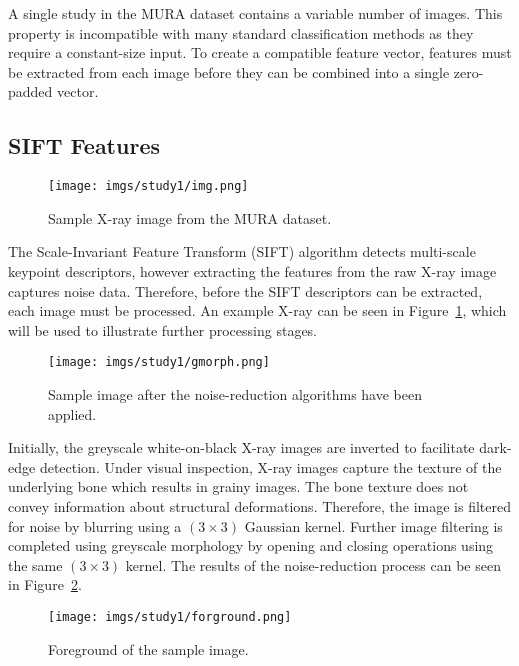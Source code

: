 \documentclass{IEEEtran}
\begin{document}
	A single study in the MURA dataset contains a variable number of images. This property is incompatible with many standard classification methods as they require a constant-size input. To create a compatible feature vector, features must be extracted from each image before they can be combined into a single zero-padded vector. 
	
	\subsection{SIFT Features}
	
	\begin{figure}[b!]
		\centering
		\texttt{[image: imgs/study1/img.png]}
		\caption{Sample X-ray image from the MURA dataset.}
		\label{fig:img}
	\end{figure}
	
	The Scale-Invariant Feature Transform (SIFT) \cite{lowe2004distinctive} algorithm detects multi-scale keypoint descriptors, however extracting the features from the raw X-ray image captures noise data. Therefore, before the SIFT descriptors can be extracted, each image must be processed. An example X-ray can be seen in Figure~\ref{fig:img}, which will be used to illustrate further processing stages.
	
	\begin{figure}[t!]
		\centering
		\texttt{[image: imgs/study1/gmorph.png]}
		\caption{Sample image after the noise-reduction algorithms have been applied.}
		\label{fig:gmorph}
	\end{figure}
	
	Initially, the greyscale white-on-black X-ray images are inverted to facilitate dark-edge detection. Under visual inspection, X-ray images capture the texture of the underlying bone which results in grainy images. The bone texture does not convey information about structural deformations. Therefore, the image is filtered for noise by blurring using a $(3 \times 3)$ Gaussian kernel. Further image filtering is completed using greyscale morphology by opening and closing operations using the same $(3 \times 3)$ kernel. The results of the noise-reduction process can be seen in Figure~\ref{fig:gmorph}.
	
	\begin{figure}[b!]
		\centering
		\texttt{[image: imgs/study1/forground.png]}
		\caption{Foreground of the sample image.}
		\label{fig:foreground}
	\end{figure}
	
\end{document}
